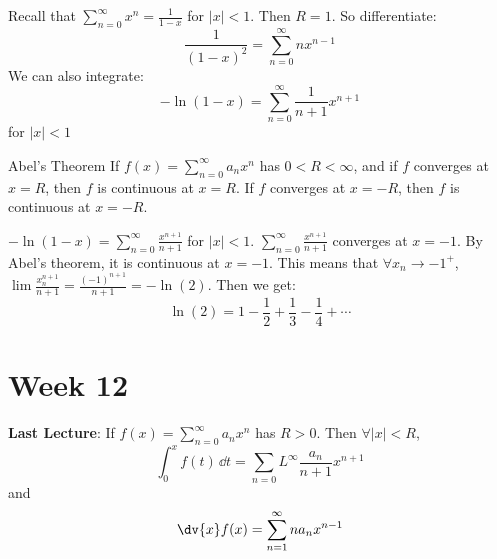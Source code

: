 \documentclass{report}
\begin{document}
\begin{examples}
    \begin{example}
        Recall that $\sum_{n = 0}^{\infty} x^{n} = \frac{1}{1 - x}$ for $\lvert x \rvert < 1$. Then $R = 1$. So differentiate:
            \begin{equation*}
                \dfrac{1}{(1 - x)^{2}} = \sum_{n = 0}^{\infty} nx^{n - 1}
            \end{equation*}
        We can also integrate:
            \begin{equation*}
                -\ln(1 - x) = \sum_{n = 0}^{\infty}\dfrac{1}{n + 1}x^{n + 1}
            \end{equation*}
        for $\lvert x \rvert < 1$
    \end{example}
\end{examples}

\begin{theorem}{Abel's Theorem}
    If $f(x) = \sum_{n = 0}^{\infty} a_{n}x^{n}$ has $0 < R < \infty$, and if $f$ converges at $x = R$, then $f$ is continuous at $x = R$. If $f$ converges at $x = -R$, then $f$ is continuous at $x = -R$.
\end{theorem}

\begin{examples}
    \begin{example}
        $-\ln(1 - x) = \sum_{n = 0}^{\infty}\frac{x^{n + 1}}{n + 1}$ for $\lvert x \rvert < 1$. $\sum_{n = 0}^{\infty}\frac{x^{n + 1}}{n + 1}$ converges at $x = -1$. By Abel's theorem, it is continuous at $x = -1$. This means that $\forall x_{n} \rightarrow-1^{+}$, $\lim \frac{x_{n}^{n + 1}}{n + 1} = \frac{(-1)^{n + 1}}{n + 1} = -\ln(2)$. Then we get:
            \begin{equation*}
                \ln(2) = 1 - \dfrac{1}{2} + \dfrac{1}{3} - \dfrac{1}{4} + \cdots
            \end{equation*}
    \end{example}
\end{examples}

\chapter{Week 12}

\textbf{Last Lecture}: If $f(x) = \sum_{n = 0}^{\infty} a_{n}x^{n}$ has $R > 0$. Then $\forall \lvert x \rvert < R$,
    \begin{equation*}
        \int_{0}^{x} f(t) \, \dd{t}  = \sum_{n = 0}L^{\infty}\dfrac{a_{n}}{n + 1}x^{n + 1}
    \end{equation*}
and
    \begin{equation*}
        \dv{x}f(x) = \sum_{n = 1}^{\infty} na_{n}x^{n - 1}
    \end{equation*}
\end{document}
